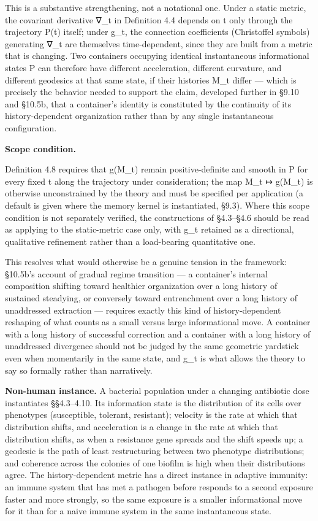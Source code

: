 \documentclass[
]{article}
\begin{document}
This is a substantive strengthening, not a notational one. Under a
static metric, the covariant derivative ∇\_t in Definition 4.4 depends
on t only through the trajectory P(t) itself; under g\_t, the connection
coefficients (Christoffel symbols) generating ∇\_t are themselves
time-dependent, since they are built from a metric that is changing. Two
containers occupying identical instantaneous informational states P can
therefore have different acceleration, different curvature, and
different geodesics at that same state, if their histories M\_t differ
--- which is precisely the behavior needed to support the claim,
developed further in §9.10 and §10.5b, that a container's identity is
constituted by the continuity of its history-dependent organization
rather than by any single instantaneous configuration.

\textbf{Scope condition.}

Definition 4.8 requires that g(M\_t) remain positive-definite and smooth
in P for every fixed t along the trajectory under consideration; the map
M\_t ↦ g(M\_t) is otherwise unconstrained by the theory and must be
specified per application (a default is given where the memory kernel is
instantiated, §9.3). Where this scope condition is not separately
verified, the constructions of §4.3--§4.6 should be read as applying to
the static-metric case only, with g\_t retained as a directional,
qualitative refinement rather than a load-bearing quantitative one.

This resolves what would otherwise be a genuine tension in the
framework: §10.5b's account of gradual regime transition --- a
container's internal composition shifting toward healthier organization
over a long history of sustained steadying, or conversely toward
entrenchment over a long history of unaddressed extraction --- requires
exactly this kind of history-dependent reshaping of what counts as a
small versus large informational move. A container with a long history
of successful correction and a container with a long history of
unaddressed divergence should not be judged by the same geometric
yardstick even when momentarily in the same state, and g\_t is what
allows the theory to say so formally rather than narratively.

\textbf{Non-human instance.} A bacterial population under a changing
antibiotic dose instantiates §§4.3--4.10. Its information state is the
distribution of its cells over phenotypes (susceptible, tolerant,
resistant); velocity is the rate at which that distribution shifts, and
acceleration is a change in the rate at which that distribution shifts,
as when a resistance gene spreads and the shift speeds up; a geodesic is
the path of least restructuring between two phenotype distributions; and
coherence across the colonies of one biofilm is high when their
distributions agree. The history-dependent metric has a direct instance
in adaptive immunity: an immune system that has met a pathogen before
responds to a second exposure faster and more strongly, so the same
exposure is a smaller informational move for it than for a naive immune
system in the same instantaneous state.
\end{document}

